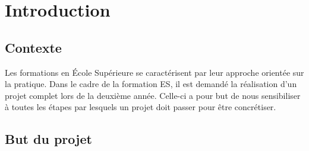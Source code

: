 \cleardoublepage
\chapter{Introduction}

\section{Contexte}

    Les formations en École Supérieure se caractérisent par leur approche orientée sur la pratique.
    Dans le cadre de la formation ES, il est demandé la réalisation d'un projet complet lors de la deuxième année. Celle-ci a pour but de nous sensibiliser à toutes les étapes par lesquels un projet doit passer pour être concrétiser.
   
    
\section{But du projet}
    \lipsum[1]

	